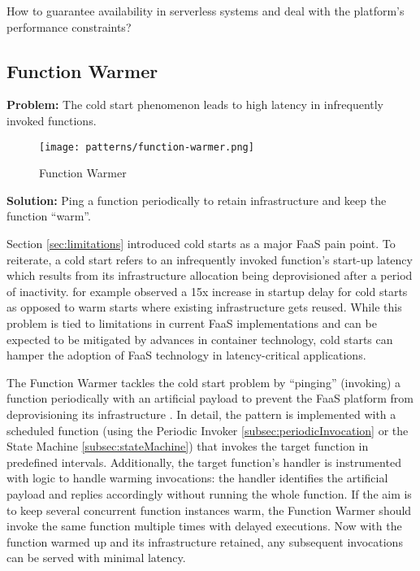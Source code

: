 How to guarantee availability in serverless systems and deal with the platform's performance constraints?

\subsection{Function Warmer} \label{subsec:FunctionWarmer}

\textbf{Problem:} The cold start phenomenon leads to high latency in infrequently invoked functions.

\begin{figure}[h]
  \centering
  \texttt{[image: patterns/function-warmer.png]}
  \caption{Function Warmer}
  \label{fig:functionWarmer}
\end{figure}

\textbf{Solution:} Ping a function periodically to retain infrastructure and keep the function ``warm''.

Section \ref{sec:limitations} introduced cold starts as a major FaaS pain point. To reiterate, a cold start refers to an infrequently invoked function's start-up latency which results from its infrastructure allocation being deprovisioned after a period of inactivity. \textcite{lloydserverless} for example observed a 15x increase in startup delay for cold starts as opposed to warm starts where existing infrastructure gets reused. While this problem is tied to limitations in current FaaS implementations and can be expected to be mitigated by advances in container technology, cold starts can hamper the adoption of FaaS technology in latency-critical applications.

The Function Warmer tackles the cold start problem by ``pinging'' (invoking) a function periodically with an artificial payload to prevent the FaaS platform from deprovisioning its infrastructure \parencite{leitner18industrialpractice}. In detail, the pattern is implemented with a scheduled function (using the Periodic Invoker \ref{subsec:periodicInvocation} or the State Machine \ref{subsec:stateMachine}) that invokes the target function in predefined intervals. Additionally, the target function's handler is instrumented with logic to handle warming invocations: the handler identifies the artificial payload and replies accordingly without running the whole function. If the aim is to keep several concurrent function instances warm, the Function Warmer should invoke the same function multiple times with delayed executions. Now with the function warmed up and its infrastructure retained, any subsequent invocations can be served with minimal latency.

